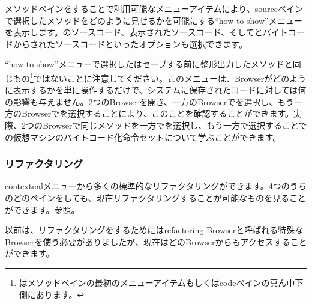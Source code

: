 \documentclass[a4paper,10pt,twoside]{book}
\begin{document}
メソッドペインを\actclick することで利用可能なメニューアイテムにより、sourceペインで選択したメソッドをどのように見せるかを可能にする``how to show''メニューを表示します。のソースコード、表示されたソースコード、そしてとバイトコードからされたソースコードといったオプションも選択できます。

``how to show''メニューで選択したはセーブする前に整形出力したメソッドと同じもの\footnote{はメソッドペインの最初のメニューアイテムもしくはcodeペインの真ん中下側にあります。}ではないことに注意してください。このメニューは、Browserがどのように表示するかを単に操作するだけで、システムに保存されたコードに対しては何の影響も与えません。2つのBrowserを開き、一方のBrowserでを選択し、もう一方のBrowserでを選択することにより、このことを確認することができます。実際、2つのBrowserで同じメソッドを一方でを選択し、もう一方で選択することで\pharo の仮想マシンのバイトコード化命令セットについて学ぶことができます。

\subsubsection{リファクタリング}

contextualメニューから多くの標準的なリファクタリングができます。4つのうちのどのペインを\actclick しても、現在リファクタリングすることが可能なものを見ることができます。参照。

以前は、リファクタリングをするためにはrefactoring Browserと呼ばれる特殊なBrowserを使う必要がありましたが、現在はどのBrowserからもアクセスすることができます。
\end{document}
